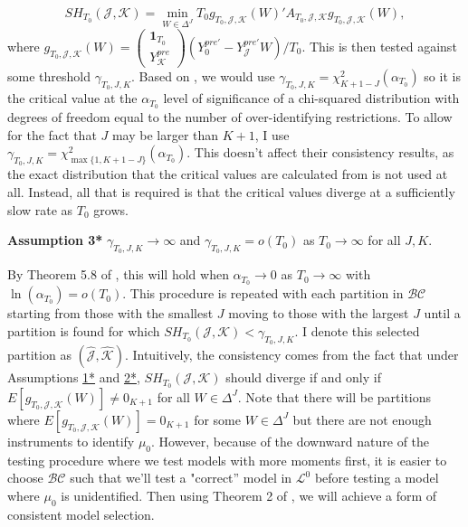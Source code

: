 \documentclass{article}
\begin{document}
\begin{equation*}
    SH_{T_0}(\mathcal{J},\mathcal{K}) = \min_{W \in \Delta^J} T_0g_{T_0,\mathcal{J},\mathcal{K}}(W)'A_{T_0,\mathcal{J},\mathcal{K}}g_{T_0,\mathcal{J},\mathcal{K}}(W),
\end{equation*}
where $g_{T_0,\mathcal{J},\mathcal{K}}(W) = \begin{pmatrix}
    \textbf{1}_{T_0} \\
    Y_{\mathcal{K}}^{pre}
\end{pmatrix}(Y_0^{pre'} - Y_{\mathcal{J}}^{pre'}W)/T_0$. This is then tested against some threshold $\gamma_{T_0,J,K}$. Based on \cite{MomentSelection}, we would use $\gamma_{T_0,J,K} = \chi^2_{K+1-J}(\alpha_{T_0})$ so it is the critical value at the $\alpha_{T_0}$ level of significance of a chi-squared distribution with degrees of freedom equal to the number of over-identifying restrictions. To allow for the fact that $J$ may be larger than $K+1$, I use $\gamma_{T_0,J,K} = \chi^2_{\max \{1, K+1-J\}}(\alpha_{T_0})$. This doesn't affect their consistency results, as the exact distribution that the critical values are calculated from is not used at all. Instead, all that is required is that the critical values diverge at a sufficiently slow rate as $T_0$ grows.  

\textbf{Assumption 3*}\label{A3*} $\gamma_{T_0,J,K} \rightarrow \infty$ and $\gamma_{T_0,J,K} = o(T_0)$ as $T_0 \rightarrow \infty$ for all $J,K$. 

By Theorem 5.8 of \cite{Potscher1983}, this will hold when $\alpha_{T_0} \rightarrow 0$ as $T_0 \rightarrow \infty$ with $\ln (\alpha_{T_0}) = o(T_0)$. This procedure is repeated with each partition in $\mathcal{B}\mathcal{C}$ starting from those with the smallest $J$ moving to those with the largest $J$ until a partition is found for which $SH_{T_0}(\mathcal{J},\mathcal{K}) < \gamma_{T_0,J,K}$. I denote this selected partition as $(\hat{\mathcal{J}},\hat{\mathcal{K}})$. Intuitively, the consistency comes from the fact that under Assumptions \hyperref[A1*]{1*} and \hyperref[A2*]{2*}, $SH_{T_0}(\mathcal{J},\mathcal{K})$ should diverge if and only if $E[g_{T_0,\mathcal{J},\mathcal{K}}(W)] \ne 0_{K+1}$ for all $W \in \Delta^J$. Note that there will be partitions where $E[g_{T_0,\mathcal{J},\mathcal{K}}(W)] = 0_{K+1}$ for some $W \in \Delta^J$ but there are not enough instruments to identify $\mu_0$. However, because of the downward nature of the testing procedure where we test models with more moments first, it is easier to choose $\mathcal{BC}$ such that we'll test a "correct” model in $\mathcal{L}^0$ before testing a model where $\mu_0$ is unidentified. Then using Theorem 2 of \cite{MomentSelection}, we will achieve a form of consistent model selection.
\end{document}
